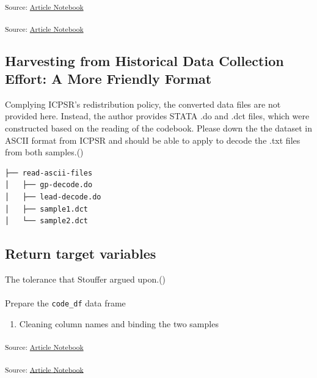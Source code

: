 \documentclass[
  letterpaper,
  DIV=11,
  numbers=noendperiod]{scrartcl}
\makeatletter
\let\oldparagraph\paragraph
\renewcommand{\paragraph}{
    \@ifstar
      \xxxParagraphStar
      \xxxParagraphNoStar
  }
\newcommand{\xxxParagraphStar}[1]{\oldparagraph*{#1}\mbox{}}
\newcommand{\xxxParagraphNoStar}[1]{\oldparagraph{#1}\mbox{}}
\providecommand{\tightlist}{%
  \setlength{\itemsep}{0pt}\setlength{\parskip}{0pt}}\usepackage{longtable,booktabs,array}
\makeatother
\begin{document}
\textsubscript{Source:
\href{https://h-christy.github.io/data-ethics-final/index.qmd.html}{Article
Notebook}}

\textsubscript{Source:
\href{https://h-christy.github.io/data-ethics-final/index.qmd.html}{Article
Notebook}}

\subsection{Harvesting from Historical Data Collection Effort: A More
Friendly
Format}\label{harvesting-from-historical-data-collection-effort-a-more-friendly-format}

Complying ICPSR's redistribution policy, the converted data files are
not provided here. Instead, the author provides STATA .do and .dct
files, which were constructed based on the reading of the codebook.
Please down the the dataset in ASCII format from ICPSR and should be
able to apply to decode the .txt files from both
samples.()

\begin{verbatim}
├── read-ascii-files
│   ├── gp-decode.do
│   ├── lead-decode.do
│   ├── sample1.dct
│   └── sample2.dct
\end{verbatim}

\subsection{Return target variables}\label{return-target-variables}

The tolerance that Stouffer argued
upon.()

\paragraph{\texorpdfstring{Prepare the \texttt{code\_df} data
frame}{Prepare the code\_df data frame}}\label{prepare-the-code_df-data-frame}

\begin{enumerate}
\def\labelenumi{\arabic{enumi}.}
\tightlist
\item
  Cleaning column names and binding the two samples
\end{enumerate}

\textsubscript{Source:
\href{https://h-christy.github.io/data-ethics-final/index.qmd.html}{Article
Notebook}}

\textsubscript{Source:
\href{https://h-christy.github.io/data-ethics-final/index.qmd.html}{Article
Notebook}}
\end{document}
